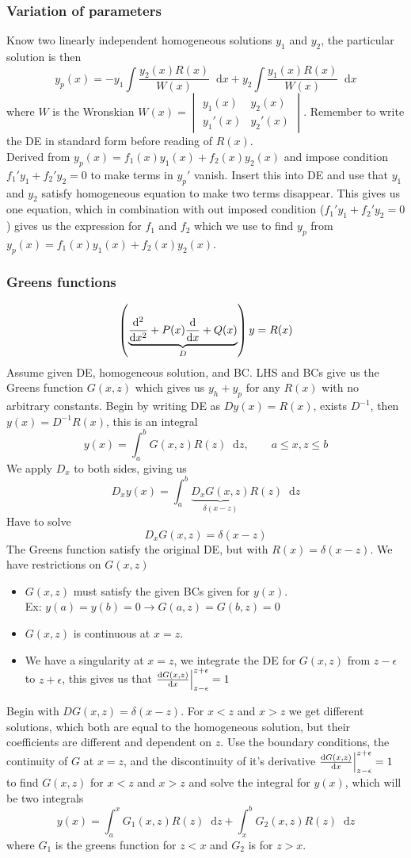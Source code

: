 \documentclass[a4paper, 10pt]{article}
\newcommand*\diff{\mathop{}\!\mathrm{d}}
\begin{document}
\begin{multicols*}{3}
\subsubsection*{\small Variation of parameters}
Know two linearly independent homogeneous solutions $y_1$ and $y_2$, the particular solution is then
$$ y_p(x) = -y_1 \int \frac{y_2(x)R(x)}{W(x)} \diff x + y_2 \int \frac{y_1(x) R(x)}{W(x)}\diff x$$
where $W$ is the Wronskian $W(x) = \begin{vmatrix} y_1(x)  & y_2(x)\\ y_1'(x) & y_2'(x) \end{vmatrix}.$ Remember to write the DE in standard form before reading of $R(x)$. \\
Derived from $y_p(x) = f_1(x)y_1(x) + f_2(x)y_2(x)$ and impose condition $f_1'y_1 + f_2'y_2 = 0$ to make terms in $y_p'$ vanish. Insert this into DE and use that $y_1$ and $y_2$ satisfy homogeneous equation to make two terms disappear. This gives us one equation, which in combination with out imposed condition ($f_1'y_1 + f_2'y_2 = 0$) gives us the expression for $f_1$ and $f_2$ which we use to find $y_p$ from $y_p(x) = f_1(x)y_1(x) + f_2(x)y_2(x)$.

\subsubsection*{\small Greens functions}
$$ \left(\underbrace{\dv[2]{}{x} + P(x)\dv{}{x} + Q(x)}_{D}\right)y = R(x) $$
Assume given DE, homogeneous solution, and BC. LHS and BCs give us the Greens function $G(x,z)$ which gives us $y_h + y_p$ for any $R(x)$ with no arbitrary constants. Begin by writing DE as $Dy(x)=R(x)$, exists $D^{-1}$, then $y(x) = D^{-1}R(x)$, this is an integral $$y(x) = \int_a^b G(x,z)R(z)\diff z, \qquad a \leq x, z \leq b$$
We apply $D_x$ to both sides, giving us
$$D_xy(x) = \int_a^b \underbrace{D_xG(x,z)}_{\delta(x-z)}R(z)\diff z$$
Have to solve
$$ D_xG(x,z) = \delta(x-z)$$
The Greens function satisfy the original DE, but with $R(x) = \delta(x-z)$. We have restrictions on $G(x,z)$
\begin{itemize}
  \item $G(x,z)$ must satisfy the given BCs given for $y(x)$.\\ Ex: $y(a)=y(b)=0 \rightarrow G(a,z) = G(b,z)=0$
  \item $G(x,z)$ is continuous at $x=z$.
  \item We have a singularity at $x=z$, we integrate the DE for $G(x,z)$ from $z-\epsilon$ to $z+\epsilon$, this gives us that $\dv{G(x,z)}{x}\Big|_{z-\epsilon}^{z+\epsilon} = 1$
\end{itemize}
Begin with $DG(x,z)=\delta(x-z)$. For $x<z$ and $x>z$ we get different solutions, which both are equal to the homogeneous solution, but their coefficients are different and dependent on $z$. Use the boundary conditions, the continuity of $G$ at $x=z$, and the discontinuity of it's derivative $\dv{G(x,z)}{x}\Big|_{z-\epsilon}^{z+\epsilon} = 1$ to find $G(x,z)$ for $x<z$ and $x>z$ and solve the integral for $y(x)$, which will be two integrals
$$y(x) = \int_a^x G_1(x,z)R(z) \diff z + \int_x^b G_2(x,z)R(z) \diff z$$
where $G_1$ is the greens function for $z<x$ and $G_2$ is for $z>x$.


\end{multicols*}
\end{document}
